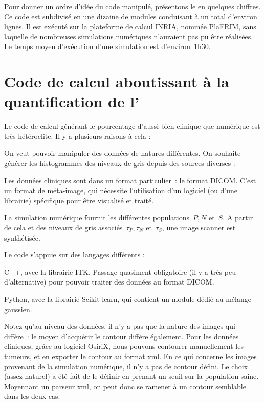 \documentclass[main.tex]{subfiles}
\begin{document}
Pour donner un ordre d'idée du code manipulé, présentons le en quelques chiffres. Ce code est subdivisé en une dizaine de modules conduisant à un total d'environ  lignes. Il est exécuté sur la plateforme de calcul INRIA, nommée PlaFRIM, sans laquelle de nombreuses simulations numériques n'auraient pas pu être réalisées. Le temps moyen d'exécution d'une simulation est d'environ~1h30. 


\section{Code de calcul aboutissant à la quantification de l'\hetero}
Le code de calcul générant le pourcentage d'\hetero aussi bien clinique que numérique est très hétéroclite. Il y a plusieurs raisons à cela :
\begin{myitemize}
\item On veut pouvoir manipuler des données de natures différentes. On souhaite générer les histogrammes des niveaux de gris depuis des sources diverses :
\begin{myitemize}[label=$-$]
\item Les données cliniques sont dans un format particulier~: le format DICOM. C'est un format de méta-image, qui nécessite l'utilisation d'un logiciel (ou d'une librairie) spécifique pour être visualisé et traité. 
\item La simulation numérique fournit les différentes populations~$P,N$ et~$S$. A partir de cela et des niveaux de gris associés~$\tau_P, \tau_N$ et~$\tau_S$, une image scanner est synthétisée.
\end{myitemize}
\item Le code s'appuie sur des langages différents :
\begin{myitemize}[label=$-$]
\item C++, avec la librairie ITK. Passage quasiment obligatoire (il y a très peu d'alternative) pour pouvoir traiter des données au format DICOM.
\item Python, avec la librairie Scikit-learn, qui contient un module dédié au mélange gaussien.
\end{myitemize}
\end{myitemize}

Notez qu'au niveau des données, il n'y a pas que la nature des images qui diffère~: le moyen d'acquérir le contour diffère également. 
Pour les données cliniques, grâce au logiciel OsiriX, nous pouvons contourer manuellement les tumeurs, et en exporter le contour au format xml. 
En ce qui concerne les images provenant de la simulation numérique, il n'y a pas de contour défini. Le choix (assez naturel) a été fait de le définir en prenant un seuil sur la population saine. Moyennant un parseur xml, on peut donc se ramener à un contour semblable dans les deux cas.
\end{document}
